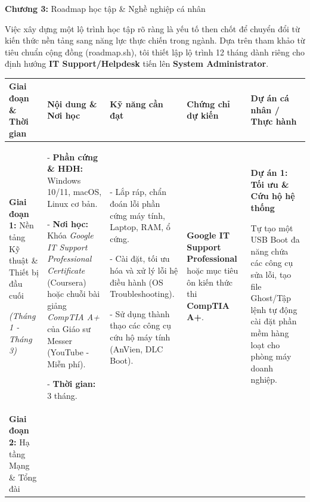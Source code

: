 \documentclass[
]{article}
\begin{document}
\textbf{Chương 3:} Roadmap học tập \& Nghề nghiệp cá nhân

Việc xây dựng một lộ trình học tập rõ ràng là yếu tố then chốt để chuyển
đổi từ kiến thức nền tảng sang năng lực thực chiến trong ngành. Dựa trên
tham khảo từ tiêu chuẩn cộng đồng (roadmap.sh), tôi thiết lập lộ trình
12 tháng dành riêng cho định hướng \textbf{IT Support/Helpdesk} tiến lên
\textbf{System Administrator}.

\begin{longtable}[]{@{}lllll@{}}
\toprule
\textbf{Giai đoạn \& Thời gian} & \textbf{Nội dung \& Nơi học} &
\textbf{Kỹ năng cần đạt} & \textbf{Chứng chỉ dự kiến} & \textbf{Dự án cá
nhân / Thực hành}\tabularnewline
\midrule
\endhead
\begin{minipage}[t]{0.17\columnwidth}\raggedright
\textbf{Giai đoạn 1:} Nền tảng Kỹ thuật \& Thiết bị đầu cuối

\emph{(Tháng 1 - Tháng 3)}\strut
\end{minipage} & \begin{minipage}[t]{0.17\columnwidth}\raggedright
- \textbf{Phần cứng \& HĐH:} Windows 10/11, macOS, Linux cơ bản.

- \textbf{Nơi học:} Khóa \emph{Google IT Support Professional
Certificate} (Coursera) hoặc chuỗi bài giảng \emph{CompTIA A+} của Giáo
sư Messer (YouTube - Miễn phí).

- \textbf{Thời gian:} 3 tháng.\strut
\end{minipage} & \begin{minipage}[t]{0.17\columnwidth}\raggedright
- Lắp ráp, chẩn đoán lỗi phần cứng máy tính, Laptop, RAM, ổ cứng.

- Cài đặt, tối ưu hóa và xử lý lỗi hệ điều hành (OS Troubleshooting).

- Sử dụng thành thạo các công cụ cứu hộ máy tính (AnVien, DLC
Boot).\strut
\end{minipage} & \begin{minipage}[t]{0.17\columnwidth}\raggedright
\textbf{Google IT Support Professional} hoặc mục tiêu ôn kiến thức thi
\textbf{CompTIA A+}.\strut
\end{minipage} & \begin{minipage}[t]{0.17\columnwidth}\raggedright
\textbf{Dự án 1: Tối ưu \& Cứu hộ hệ thống}

Tự tạo một USB Boot đa năng chứa các công cụ sửa lỗi, tạo file Ghost/Tập
lệnh tự động cài đặt phần mềm hàng loạt cho phòng máy doanh
nghiệp.\strut
\end{minipage}\tabularnewline
\begin{minipage}[t]{0.17\columnwidth}\raggedright
\textbf{Giai đoạn 2:} Hạ tầng Mạng \& Tổng đài


\end{minipage}
\end{longtable}
\end{document}
